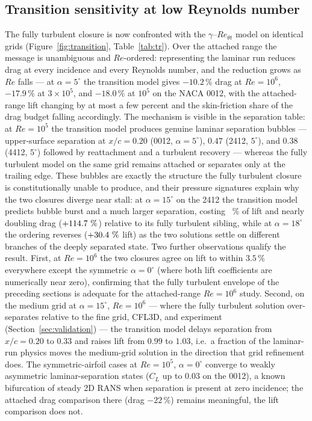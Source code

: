 \documentclass[11pt,a4paper]{article}
\begin{document}
\subsection{Transition sensitivity at low Reynolds number}\label{sec:transition}
The fully turbulent closure is now confronted with the $\gamma$--$Re_{\theta t}$ model on identical grids (Figure~\ref{fig:transition}, Table~\ref{tab:tr}). Over the attached range the message is unambiguous and $Re$-ordered: representing the laminar run reduces drag at every incidence and every Reynolds number, and the reduction grows as $Re$ falls --- at $\alpha = 5^\circ$ the transition model gives $-10.2\,\%$ drag at $Re = 10^6$, $-17.9\,\%$ at $3\times10^5$, and $-18.0\,\%$ at $10^5$ on the NACA 0012, with the attached-range lift changing by at most a few percent and the skin-friction share of the drag budget falling accordingly. The mechanism is visible in the separation table: at $Re = 10^5$ the transition model produces genuine laminar separation bubbles --- upper-surface separation at $x/c = 0.20$ (0012, $\alpha = 5^\circ$), $0.47$ (2412, $5^\circ$), and $0.38$ (4412, $5^\circ$) followed by reattachment and a turbulent recovery --- whereas the fully turbulent model on the same grid remains attached or separates only at the trailing edge. These bubbles are exactly the structure the fully turbulent closure is constitutionally unable to produce, and their pressure signatures explain why the two closures diverge near stall: at $\alpha = 15^\circ$ on the 2412 the transition model predicts bubble burst and a much larger separation, costing \TrClPctFifteenTwoFourOneTwo{}~\% of lift and nearly doubling drag ($+114.7{}~\%$) relative to its fully turbulent sibling, while at $\alpha = 18^\circ$ the ordering reverses ($+30.4{}~\%$ lift) as the two solutions settle on different branches of the deeply separated state. Two further observations qualify the result. First, at $Re = 10^6$ the two closures agree on lift to within $3.5\,\%$ everywhere except the symmetric $\alpha = 0^\circ$ (where both lift coefficients are numerically near zero), confirming that the fully turbulent envelope of the preceding sections is adequate for the attached-range $Re = 10^6$ study. Second, on the medium grid at $\alpha = 15^\circ$, $Re = 10^6$ --- where the fully turbulent solution over-separates relative to the fine grid, CFL3D, and experiment (Section~\ref{sec:validation}) --- the transition model delays separation from $x/c = 0.20$ to $0.33$ and raises lift from $0.99$ to $1.03$, i.e.\ a fraction of the laminar-run physics moves the medium-grid solution in the direction that grid refinement does. The symmetric-airfoil cases at $Re = 10^5$, $\alpha = 0^\circ$ converge to weakly asymmetric laminar-separation states ($C_L$ up to $0.03$ on the 0012), a known bifurcation of steady 2D RANS when separation is present at zero incidence; the attached drag comparison there (drag $-22\,\%$) remains meaningful, the lift comparison does not.
\end{document}
